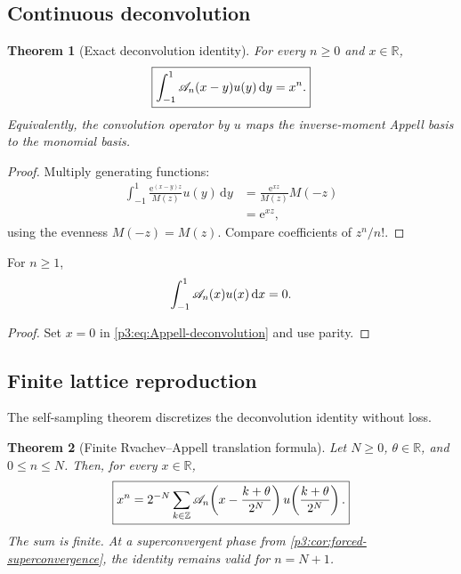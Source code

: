 \documentclass[11pt,oneside]{article}
\numberwithin{equation}{section}
\newtheorem{theorem}{Theorem}[section]
\theoremstyle{definition}
\theoremstyle{remark}
\newcommand{\R}{\mathbb R}
\newcommand{\Z}{\mathbb Z}
\newcommand{\e}{\mathrm e}
\newcommand{\dd}{\,\mathrm d}
\begin{document}
\subsection{Continuous deconvolution}

\begin{theorem}[Exact deconvolution identity]
\label{p3:thm:Appell-deconvolution}
For every $n\ge0$ and $x\in\R$,
\begin{equation}
 \boxed{\displaystyle
 \int_{-1}^{1}\Acal_n(x-y)u(y)\dd y=x^n.}
 \label{p3:eq:Appell-deconvolution}
\end{equation}
Equivalently, the convolution operator by $u$ maps the inverse-moment Appell basis to the monomial basis.
\end{theorem}

\begin{proof}
Multiply generating functions:
\begin{align*}
 \int_{-1}^{1}\frac{\e^{(x-y)z}}{M(z)}u(y)\dd y
 &=\frac{\e^{xz}}{M(z)}M(-z)\\
 &=\e^{xz},
\end{align*}
using the evenness $M(-z)=M(z)$.  Compare coefficients of $z^n/n!$.
\end{proof}

\begin{corollary}
\label{p3:cor:Appell-mean-zero}
For $n\ge1$,
\begin{equation}
 \int_{-1}^{1}\Acal_n(x)u(x)\dd x=0.
 \label{p3:eq:Appell-mean-zero}
\end{equation}
\end{corollary}

\begin{proof}
Set $x=0$ in \eqref{p3:eq:Appell-deconvolution} and use parity.
\end{proof}

\subsection{Finite lattice reproduction}

The self-sampling theorem discretizes the deconvolution identity without loss.

\begin{theorem}[Finite Rvachev--Appell translation formula]
\label{p3:thm:Appell-lattice-reproduction}
Let $N\ge0$, $\theta\in\R$, and $0\le n\le N$.  Then, for every $x\in\R$,
\begin{equation}
 \boxed{\displaystyle
 x^n=2^{-N}\sum_{k\in\Z}
 \Acal_n\!\left(x-\frac{k+\theta}{2^N}\right)
 u\!\left(\frac{k+\theta}{2^N}\right).}
 \label{p3:eq:Appell-lattice-reproduction}
\end{equation}
The sum is finite.  At a superconvergent phase from \cref{p3:cor:forced-superconvergence}, the identity remains valid for $n=N+1$.
\end{theorem}
\end{document}

